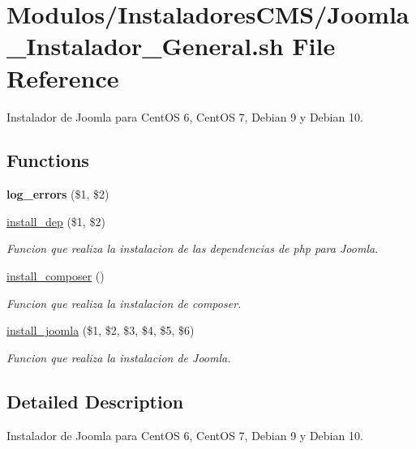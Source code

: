 \hypertarget{Joomla__Instalador__General_8sh}{}\section{Modulos/\+Instaladores\+C\+M\+S/\+Joomla\+\_\+\+Instalador\+\_\+\+General.sh File Reference}
\label{Joomla__Instalador__General_8sh}


Instalador de Joomla para Cent\+OS 6, Cent\+OS 7, Debian 9 y Debian 10.  


\subsection*{Functions}
\begin{DoxyCompactItemize}
\item 
\mbox{\label{Joomla__Instalador__General_8sh_a92067b58a8478c9841b2cd9b75ea3565}} 
{\bfseries log\+\_\+errors} (\$1, \$2)
\item 
\hyperlink{Joomla__Instalador__General_8sh_a7aff02becf631a8cd3f06f1fc2688670}{install\+\_\+dep} (\$1, \$2)
\begin{DoxyCompactList}\small\item\em Funcion que realiza la instalacion de las dependencias de php para Joomla. \end{DoxyCompactList}\item 
\hyperlink{Joomla__Instalador__General_8sh_a9cbb91389a71b89c6cab0848d688e423}{install\+\_\+composer} ()
\begin{DoxyCompactList}\small\item\em Funcion que realiza la instalacion de composer. \end{DoxyCompactList}\item 
\hyperlink{Joomla__Instalador__General_8sh_a2fe507c06e35ed263e2e999b75609e70}{install\+\_\+joomla} (\$1, \$2, \$3, \$4, \$5, \$6)
\begin{DoxyCompactList}\small\item\em Funcion que realiza la instalacion de Joomla. \end{DoxyCompactList}\end{DoxyCompactItemize}


\subsection{Detailed Description}
Instalador de Joomla para Cent\+OS 6, Cent\+OS 7, Debian 9 y Debian 10. 

